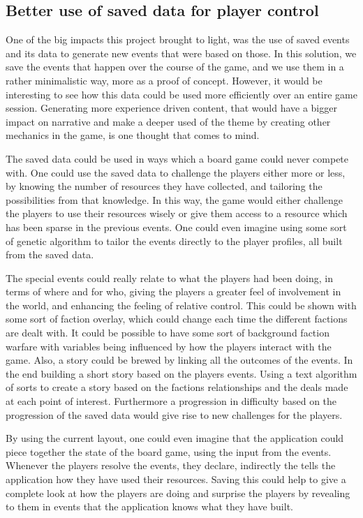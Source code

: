 \subsection{Better use of saved data for player control}
\label{sec:savdat}
One of the big impacts this project brought to light, was the use of saved events and its data to generate new events that were based on those. In this solution, we save the events that happen over the course of the game, and we use them in a rather minimalistic way, more as a proof of concept. However, it would be interesting to see how this data could be used more efficiently over an entire game session. Generating more experience driven content, that would have a bigger impact on narrative and make a deeper used of the theme by creating other mechanics in the game, is one thought that comes to mind. 

The saved data could be used in ways which a board game could never compete with. One could use the saved data to challenge the players either more or less, by knowing the number of resources they have collected, and tailoring the possibilities from that knowledge. In this way, the game would either challenge the players to use their resources wisely or give them access to a resource which has been sparse in the previous events. One could even imagine using some sort of genetic algorithm to tailor the events directly to the player profiles, all built from the saved data.

The special events could really relate to what the players had been doing, in terms of where and for who, giving the players a greater feel of involvement in the world, and enhancing the feeling of relative control. This could be shown with some sort of faction overlay, which could change each time the different factions are dealt with. It could be possible to have some sort of background faction warfare with variables being influenced by how the players interact with the game. Also, a story could be brewed by linking all the outcomes of the events. In the end building a short story based on the players events. Using a text algorithm of sorts to create a story based on the factions relationships and the deals made at each point of interest. Furthermore a progression in difficulty based on the progression of the saved data would give rise to new challenges for the players.

By using the current layout, one could even imagine that the application could piece together the state of the board game, using the input from the events. Whenever the players resolve the events, they declare, indirectly the tells the application how they have used their resources. Saving this could help to give a complete look at how the players are doing and surprise the players by revealing to them in events that the application knows what they have built.

